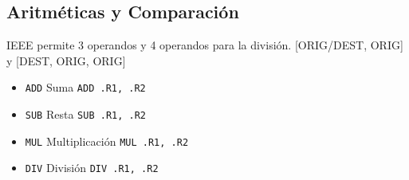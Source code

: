 \documentclass[a4paper,11pt,spanish]{report}
\begin{document}
\subsection{Aritméticas y Comparación}
IEEE permite 3 operandos y 4 operandos para la división.
[ORIG/DEST, ORIG] y [DEST, ORIG, ORIG]
\begin{itemize}
\item \verb|ADD| Suma \textrightarrow \verb|ADD .R1, .R2|
\item \verb|SUB| Resta \textrightarrow \verb|SUB .R1, .R2|
\item \verb|MUL| Multiplicación \textrightarrow \verb|MUL .R1, .R2|
\item \verb|DIV| División \textrightarrow \verb|DIV .R1, .R2|
\end{itemize}
\end{document}
